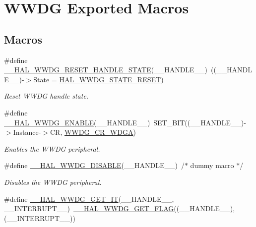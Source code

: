 \hypertarget{group___w_w_d_g___exported___macros}{}\section{W\+W\+DG Exported Macros}
\label{group___w_w_d_g___exported___macros}
\subsection*{Macros}
\begin{DoxyCompactItemize}
\item 
\#define \hyperlink{group___w_w_d_g___exported___macros_gadb7c147b55b6386d487d717b20cd1070}{\+\_\+\+\_\+\+H\+A\+L\+\_\+\+W\+W\+D\+G\+\_\+\+R\+E\+S\+E\+T\+\_\+\+H\+A\+N\+D\+L\+E\+\_\+\+S\+T\+A\+TE}(\+\_\+\+\_\+\+H\+A\+N\+D\+L\+E\+\_\+\+\_\+)~((\+\_\+\+\_\+\+H\+A\+N\+D\+L\+E\+\_\+\+\_\+)-\/$>$State = \hyperlink{group___w_w_d_g___exported___types_gga0dbbade5e745711745e5f9cc10991301ab372108da0acc98eafe256ac1789c6a5}{H\+A\+L\+\_\+\+W\+W\+D\+G\+\_\+\+S\+T\+A\+T\+E\+\_\+\+R\+E\+S\+ET})
\begin{DoxyCompactList}\small\item\em Reset W\+W\+DG handle state. \end{DoxyCompactList}\item 
\#define \hyperlink{group___w_w_d_g___exported___macros_gaad04976da12e2c801c72668b8e100d80}{\+\_\+\+\_\+\+H\+A\+L\+\_\+\+W\+W\+D\+G\+\_\+\+E\+N\+A\+B\+LE}(\+\_\+\+\_\+\+H\+A\+N\+D\+L\+E\+\_\+\+\_\+)~S\+E\+T\+\_\+\+B\+IT((\+\_\+\+\_\+\+H\+A\+N\+D\+L\+E\+\_\+\+\_\+)-\/$>$Instance-\/$>$CR, \hyperlink{group___peripheral___registers___bits___definition_gab647e9997b8b8e67de72af1aaea3f52f}{W\+W\+D\+G\+\_\+\+C\+R\+\_\+\+W\+D\+GA})
\begin{DoxyCompactList}\small\item\em Enables the W\+W\+DG peripheral. \end{DoxyCompactList}\item 
\#define \hyperlink{group___w_w_d_g___exported___macros_ga47493f974c7779d5dd699a96acc479a0}{\+\_\+\+\_\+\+H\+A\+L\+\_\+\+W\+W\+D\+G\+\_\+\+D\+I\+S\+A\+B\+LE}(\+\_\+\+\_\+\+H\+A\+N\+D\+L\+E\+\_\+\+\_\+)~/$\ast$ dummy  macro $\ast$/
\begin{DoxyCompactList}\small\item\em Disables the W\+W\+DG peripheral. \end{DoxyCompactList}\item 
\#define \hyperlink{group___w_w_d_g___exported___macros_ga80eb5c31bde6248b9fe38a6f7bd1710d}{\+\_\+\+\_\+\+H\+A\+L\+\_\+\+W\+W\+D\+G\+\_\+\+G\+E\+T\+\_\+\+IT}(\+\_\+\+\_\+\+H\+A\+N\+D\+L\+E\+\_\+\+\_\+,  \+\_\+\+\_\+\+I\+N\+T\+E\+R\+R\+U\+P\+T\+\_\+\+\_\+)~\hyperlink{group___w_w_d_g___exported___macros_ga60a99447a00a7d95c18637c38147063a}{\+\_\+\+\_\+\+H\+A\+L\+\_\+\+W\+W\+D\+G\+\_\+\+G\+E\+T\+\_\+\+F\+L\+AG}((\+\_\+\+\_\+\+H\+A\+N\+D\+L\+E\+\_\+\+\_\+),(\+\_\+\+\_\+\+I\+N\+T\+E\+R\+R\+U\+P\+T\+\_\+\+\_\+))

\end{DoxyCompactItemize}
